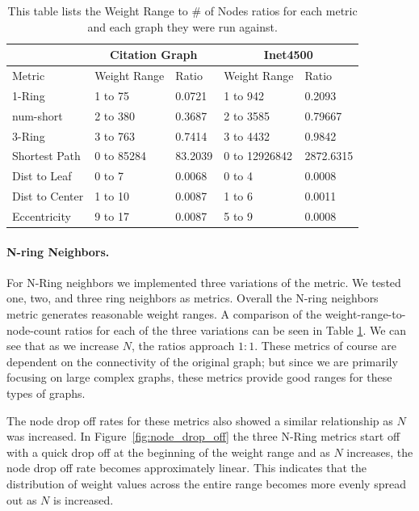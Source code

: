 \begin{table}
\begin{center}
\begin{tabular}{|l|l|l|l|l|}
\hline
 & \multicolumn{2}{|c|}{Citation Graph} & \multicolumn{2}{|c|}{Inet4500} \\
\hline
Metric & Weight Range & Ratio & Weight Range & Ratio \\
\hline
1-Ring& 1 to 75 & 0.0721 & 1 to 942 & 0.2093 \\
num-short & 2 to 380 & 0.3687 & 2 to 3585 & 0.79667 \\
3-Ring & 3 to 763 & 0.7414  & 3 to 4432 & 0.9842 \\
Shortest Path & 0 to 85284 & 83.2039 & 0 to 12926842 & 2872.6315 \\
Dist to Leaf & 0 to 7 & 0.0068 & 0 to 4 & 0.0008 \\
Dist to Center & 1 to 10 & 0.0087 & 1 to 6 & 0.0011 \\
Eccentricity & 9 to 17 & 0.0087 & 5 to 9 & 0.0008 \\
\hline
\end{tabular}
\caption{This table lists the Weight Range to \# of Nodes ratios for each metric and each graph they were run against.}
\label{tbl:weight_ratio}
\end{center}
\end{table}



\paragraph*{N-ring Neighbors.}
For N-Ring neighbors we implemented three variations of the metric.  We tested one, two, and three ring neighbors as metrics.  Overall the N-ring neighbors metric generates reasonable weight ranges.  A comparison of the weight-range-to-node-count ratios for each of the three variations can be seen in
Table \ref{tbl:weight_ratio}.  We can see that as we increase $N$, the ratios approach $1:1$.  These metrics of course are dependent on the connectivity of the original graph; but since we are primarily focusing on large complex graphs, these metrics provide good ranges for these types of graphs.

The node drop off rates for these metrics also showed a similar relationship as $N$ was increased.  In Figure~\ref{fig:node_drop_off} the three N-Ring metrics start off with a quick drop off at the beginning of the weight range and as $N$ increases, the node drop off rate becomes approximately linear.  This indicates that the distribution of weight values across the entire range becomes more evenly spread out as $N$ is increased.

